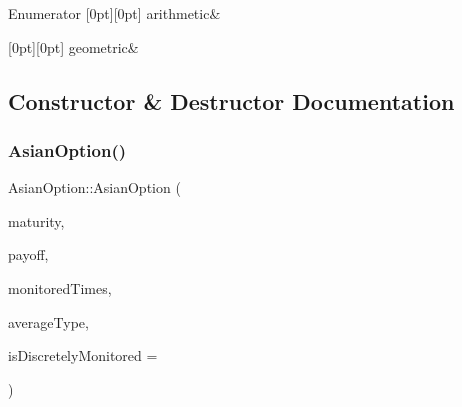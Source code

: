 \begin{DoxyEnumFields}{Enumerator}
[0pt][0pt]{}\hypertarget{class_asian_option_add7292791bf85820ff9fdbfd4407f3b9aff8fffb81d05144807269caa96d3b145}{}\label{class_asian_option_add7292791bf85820ff9fdbfd4407f3b9aff8fffb81d05144807269caa96d3b145} 
arithmetic&\\
\hline

[0pt][0pt]{}\hypertarget{class_asian_option_add7292791bf85820ff9fdbfd4407f3b9a17b74dba78a6e25158da4eb685ecfa4e}{}\label{class_asian_option_add7292791bf85820ff9fdbfd4407f3b9a17b74dba78a6e25158da4eb685ecfa4e} 
geometric&\\
\hline

\end{DoxyEnumFields}


\subsection{Constructor \& Destructor Documentation}
\hypertarget{class_asian_option_aa4020dfa8edd8d1e8f2756b633b3828b}{}\label{class_asian_option_aa4020dfa8edd8d1e8f2756b633b3828b} 
\subsubsection{\texorpdfstring{Asian\+Option()}{AsianOption()}\hspace{0.1cm}{\footnotesize\ttfamily [1/3]}}
{\footnotesize\ttfamily Asian\+Option\+::\+Asian\+Option (\begin{DoxyParamCaption}\item[{\hyperlink{_name_def_8h_ac2d3e0ba793497bcca555c7c2cf64ff3}{Time}}]{maturity,  }\item[{std\+::shared\+\_\+ptr$<$ \hyperlink{class_payoff}{Payoff} $>$}]{payoff,  }\item[{std\+::vector$<$ \hyperlink{_name_def_8h_ac2d3e0ba793497bcca555c7c2cf64ff3}{Time} $>$ \&}]{monitored\+Times,  }\item[{\hyperlink{class_asian_option_add7292791bf85820ff9fdbfd4407f3b9}{Average\+Type}}]{average\+Type,  }\item[{bool}]{is\+Discretely\+Monitored = {} }\end{DoxyParamCaption})}

